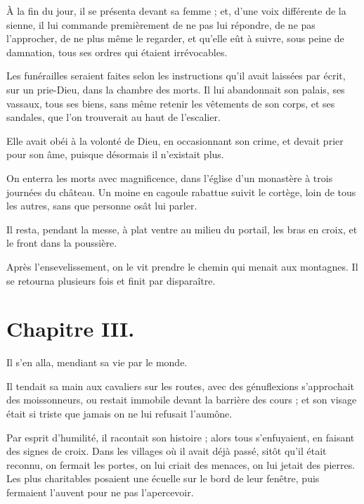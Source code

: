 \documentclass[]{book}
\begin{document}
                À la fin du jour, il se présenta devant sa femme ; et, d'une voix différente de la sienne, il lui commande premièrement de ne pas lui répondre, de ne pas l'approcher, de ne plus même le regarder, et qu'elle eût à suivre, sous peine de damnation, tous ses ordres qui étaient irrévocables.
                    
                Les funérailles seraient faites selon les instructions qu'il avait laissées par écrit, sur un prie-Dieu, dans la chambre des morts. Il lui abandonnait son palais, ses vassaux, tous ses biens, sans même retenir les vêtements de son corps, et ses sandales, que l'on trouverait au haut de l'escalier.
                    
                Elle avait obéi à la volonté de Dieu, en occasionnant son crime, et devait prier pour son âme, puisque désormais il n'existait plus.
                    
                On enterra les morts avec magnificence, dans l'église d'un monastère à trois journées du château. Un moine en cagoule rabattue suivit le cortège, loin de tous les autres, sans que personne osât lui parler.
                    
                Il resta, pendant la messe, à plat ventre au milieu du portail, les bras en croix, et le front dans la poussière.
                    
                Après l'ensevelissement, on le vit prendre le chemin qui menait aux montagnes. Il se retourna plusieurs fois et finit par disparaître.
                    
                
            \chapter{Chapitre III.}
            
            Il s'en alla, mendiant sa vie par le monde.
                    
                Il tendait sa main aux cavaliers sur les routes, avec des génuflexions s'approchait des moissonneurs, ou restait immobile devant la barrière des cours ; et son visage était si triste que jamais on ne lui refusait l'aumône.
                    
                Par esprit d'humilité, il racontait son histoire ; alors tous s'enfuyaient, en faisant des signes de croix. Dans les villages où il avait déjà passé, sitôt qu'il était reconnu, on fermait les portes, on lui criait des menaces, on lui jetait des pierres. Les plus charitables posaient une écuelle sur le bord de leur fenêtre, puis fermaient l'auvent pour ne pas l'apercevoir.
                    
\end{document}
